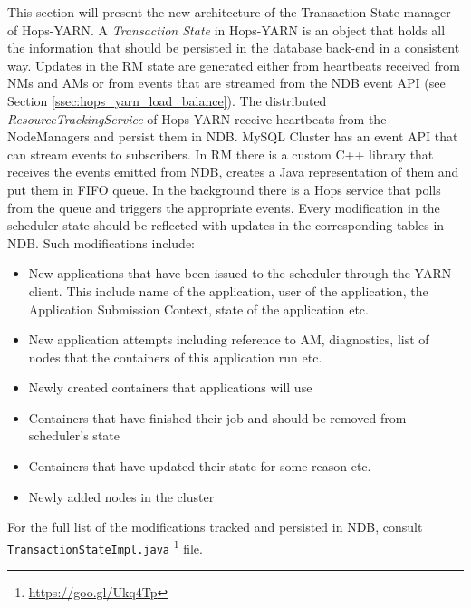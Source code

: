 This section will present the new architecture of the Transaction
State manager of Hops-YARN. A \emph{Transaction State} in Hops-YARN is
an object that holds all the information that should be persisted in
the database back-end in a consistent way. Updates in the RM state are
generated either from heartbeats received from NMs and AMs or from
events that are streamed from the NDB event API (see Section
\ref{ssec:hops_yarn_load_balance}). The distributed
\emph{ResourceTrackingService} of Hops-YARN receive heartbeats from the
NodeManagers and persist them in NDB. MySQL Cluster has an event API
that can stream events to subscribers. In RM there is a custom C++
library that receives the events emitted from NDB, creates a Java
representation of them and put them in FIFO queue. In the background
there is a Hops service that polls from the queue and triggers the
appropriate events. Every modification in the
scheduler state should be reflected with updates in the corresponding
tables in NDB. Such modifications include:
\begin{itemize}
\item New applications that have been issued to the scheduler through
the YARN client. This include name of the application, user of
the application, the Application Submission Context, state of the
application etc.

\item New application attempts including reference to AM,
diagnostics, list of nodes that the containers of this application run
etc.

\item Newly created containers that applications will use

\item Containers that have finished their job and should be removed
from scheduler's state

\item Containers that have updated their state for some reason etc.

\item Newly added nodes in the cluster
\end{itemize}

For the full list of the modifications tracked and persisted in NDB,
consult \texttt{TransactionStateImpl.java}
\footnote{\url{https://goo.gl/Ukq4Tp}} file.

